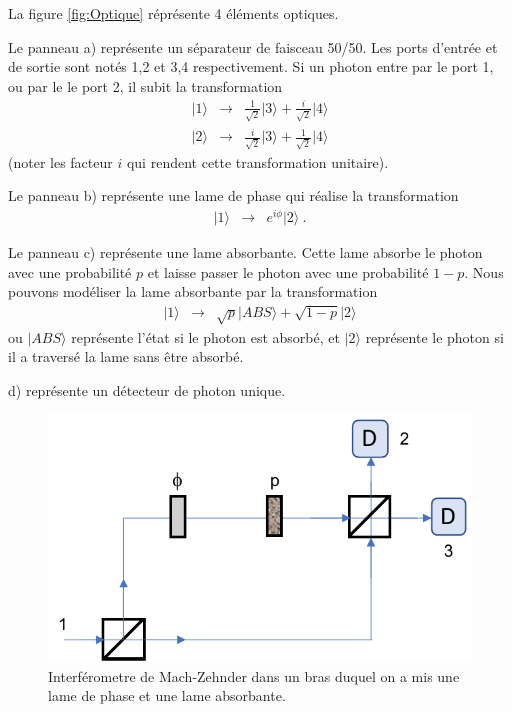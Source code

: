 La figure \ref{fig:Optique} réprésente 4 éléments optiques.

Le panneau a) représente un séparateur de faisceau 50/50. Les ports d'entrée et de sortie sont notés 1,2 et 3,4 respectivement. Si un photon entre par le port 1, ou par le le port 2, il subit la transformation
\begin{eqnarray}
\vert 1 \rangle &\to & \frac{1}{\sqrt{2}} \vert 3 \rangle + \frac{i}{\sqrt{2}} \vert 4 \rangle \\
\vert 2 \rangle &\to & \frac{i}{\sqrt{2}} \vert 3 \rangle + \frac{1}{\sqrt{2}} \vert 4 \rangle 
\end{eqnarray}
(noter les facteur $i$ qui rendent cette transformation unitaire).

Le panneau b) représente une lame de phase qui réalise la transformation
\begin{eqnarray}
\vert 1 \rangle &\to & e^{i \phi}  \vert 2 \rangle \ .
\label{Eq:opt3}
\end{eqnarray}

Le panneau c) représente une lame absorbante. Cette lame absorbe le photon avec une probabilité $p$ et laisse passer le photon avec une probabilité $1-p$. Nous pouvons modéliser la lame absorbante par la transformation
\begin{eqnarray}
\vert 1 \rangle &\to & \sqrt{p}  \vert ABS \rangle + \sqrt{1-p}  \vert 2 \rangle 
\end{eqnarray}
ou $\vert ABS \rangle$ représente l'état si le photon est absorbé, et $\vert 2 \rangle $ représente le photon si il a traversé la lame sans être absorbé.

d) représente un détecteur de photon unique.



\begin{figure}[h!]
\begin{center}
\includegraphics[width=0.5\columnwidth]{Pictures/Fig-Interf.pdf} 
\end{center}
\caption{Interférometre de Mach-Zehnder dans un bras duquel on a mis une lame de phase et une lame absorbante.}
\label{fig:MZ}
\end{figure}


